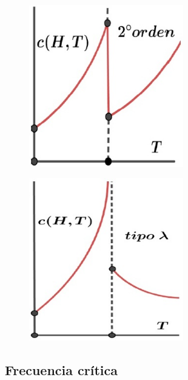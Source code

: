 \begin{figure}[H]
  \begin{minipage}[b]{0.47\textwidth}
    \centering    
    \includegraphics[width=0.6\textwidth]{./Figures/fig432}
	\label{fig:429}
  \end{minipage}
  \hfill
  \begin{minipage}[b]{0.47\textwidth}
	\centering
    \includegraphics[width=0.6\textwidth]{./Figures/fig433}
	\label{fig:430}
  \end{minipage}
\end{figure}


\subsection{Frecuencia crítica}

